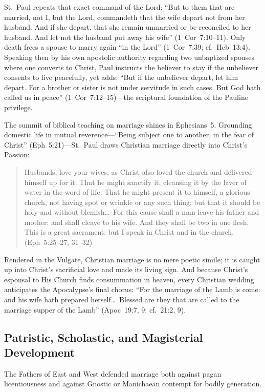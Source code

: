 St.~Paul repeats that exact command of the Lord: ``But to them that are married, not I, but the Lord, commandeth that the wife depart not from her husband. And if she depart, that she remain unmarried or be reconciled to her husband. And let not the husband put away his wife'' (1~Cor~7:10--11). Only death frees a spouse to marry again ``in the Lord'' (1~Cor~7:39; cf.~Heb~13:4). Speaking then by his own apostolic authority regarding two unbaptized spouses where one converts to Christ, Paul instructs the believer to stay if the unbeliever consents to live peacefully, yet adds: ``But if the unbeliever depart, let him depart. For a brother or sister is not under servitude in such cases. But God hath called us in peace'' (1~Cor~7:12--15)---the scriptural foundation of the Pauline privilege.

The summit of biblical teaching on marriage shines in Ephesians~5. Grounding domestic life in mutual reverence---``Being subject one to another, in the fear of Christ'' (Eph~5:21)---St.~Paul draws Christian marriage directly into Christ's Passion:
\begin{quotation}
Husbands, love your wives, as Christ also loved the church and delivered himself up for it: That he might sanctify it, cleansing it by the laver of water in the word of life: That he might present it to himself, a glorious church, not having spot or wrinkle or any such thing; but that it should be holy and without blemish\ldots\ For this cause shall a man leave his father and mother: and shall cleave to his wife. And they shall be two in one flesh. This is a great sacrament: but I speak in Christ and in the church. (Eph~5:25--27, 31--32)
\end{quotation}
Rendered  in the Vulgate, Christian marriage is no mere poetic simile; it is caught up into Christ's sacrificial love and made its living sign. And because Christ's espousal to His Church finds consummation in heaven, every Christian wedding anticipates the Apocalypse's final chorus: ``For the marriage of the Lamb is come: and his wife hath prepared herself\ldots\ Blessed are they that are called to the marriage supper of the Lamb'' (Apoc~19:7, 9; cf.~21:2, 9).

\subsection{Patristic, Scholastic, and Magisterial Development}
\label{subsec:matrimony-tradition}

The Fathers of East and West defended marriage both against pagan licentiousness and against Gnostic or Manichaean contempt for bodily generation.

